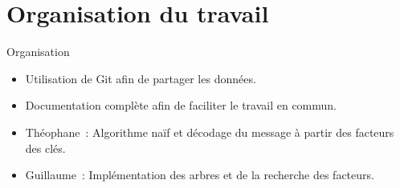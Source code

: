 \documentclass{beamer}
\begin{document}
\section{Organisation du travail}
\begin{frame}
 \begin{block}{Organisation}
  \begin{itemize}
   \item Utilisation de Git afin de partager les données.
   \item Documentation complète afin de faciliter le travail en commun.
   \item Théophane~: Algorithme naïf et décodage du message à partir des facteurs des clés.
   \item Guillaume~: Implémentation des arbres et de la recherche des facteurs.
  \end{itemize}

 \end{block}

\end{frame}
\end{document}
